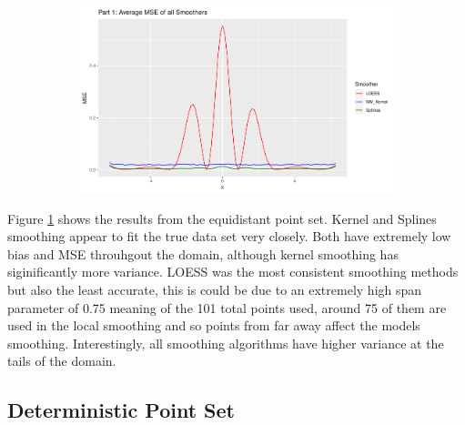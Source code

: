 \documentclass[12pt,letterpaper]{article}
\begin{document}
\begin{figure}[!htp]
\begin{subfigure}{0.45\textwidth}
    \end{subfigure}
    \begin{subfigure}{0.45\textwidth}
        \includegraphics[width=\textwidth]{p1_mse}
      \end{subfigure}
    \label{fig:part1}
\end{figure}

Figure \ref{fig:part1} shows the results from the equidistant point set. Kernel and Splines smoothing appear to fit the true data set very closely. Both have extremely low bias and MSE throuhgout the domain, although kernel smoothing has siginificantly more variance. LOESS was the most consistent smoothing methods but also the least accurate, this is could be due to an extremely high span parameter of 0.75 meaning of the 101 total points used, around 75 of them are used in the local smoothing and so points from far away affect the models smoothing. Interestingly, all smoothing algorithms have higher variance at the tails of the domain. 

\subsection*{Deterministic Point Set}
\end{document}
